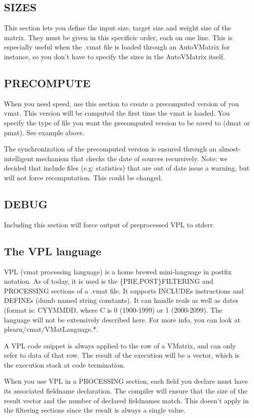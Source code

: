 \documentclass[11pt]{book}
\begin{document}
\subsection{SIZES}
This section lets you define the input size, target size and weight size of the matrix.
They must be given in this specificic order, each on one line.
This is especially useful when the .vmat file is loaded through an AutoVMatrix for instance, so
you don't have to specify the sizes in the AutoVMatrix itself.

\subsection{PRECOMPUTE}
When you need speed, use this section to create a precomputed version of you vmat. This version will be computed the first time the vmat is loaded. You specify the type of file you want the precomputed version to be saved to (dmat or pmat). See example above.

The synchronization of the precomputed version is ensured through an almost-intelligent mechanism that checks the date of sources recursively. Note: we decided that include files (e.g: statistics) that are out of date issue a warning, but will not force recomputation. This could be changed. 

\subsection{DEBUG}
Including this section will force output of preprocessed VPL to stderr.

\subsection{The VPL language}
VPL (vmat processing language) is a home brewed mini-language in postfix notation. As of today, it is used is the \{PRE,POST\}FILT\-ERING and PROCESSING sections of a .vmat file. It supports INCLUDEs instructions and DEFINEs (dumb named string constants). It can handle reals as well as dates (format is: CYYMMDD, where C is 0 (1900-1999) or 1 (2000-2099). The language will not be extensively described here. For more info, you can look at
plearn/vmat/VMatLanguage.*. 

A VPL code snippet is always applied to the row of a VMatrix, and can only refer to data of that row. The result of the execution will be a vector, which is the execution stack at code termination. 

When you use VPL in a PROCESSING section, each field you declare must have its associated fieldname declaration. The compiler will ensure that the size of the result vector and the number of declared fieldnames match. This doesn't apply in the filtering sections since the result is always a single value. 
\end{document}
